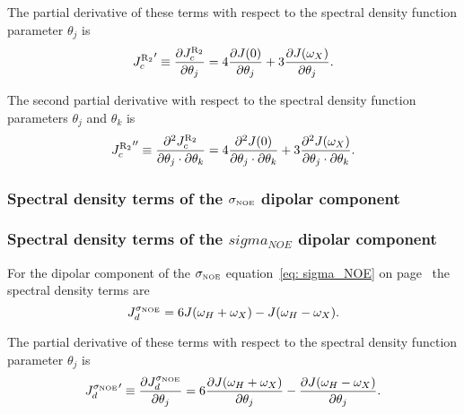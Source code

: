 \noindent The partial derivative of these terms with respect to the spectral density function parameter $\theta_j$ is
\begin{equation}
    {J_c^{\mathrm{R}_2}}' \equiv \frac{\partial J_c^{\mathrm{R}_2}}{\partial \theta_j}
        = 4 \frac{\partial J(0)}{\partial \theta_j}
        + 3 \frac{\partial J(\omega_X)}{\partial \theta_j}.  \label{eq: J terms: JR2c'}
\end{equation}

\noindent The second partial derivative with respect to the spectral density function parameters $\theta_j$ and $\theta_k$ is
\begin{equation}
    {J_c^{\mathrm{R}_2}}'' \equiv \frac{\partial^2 J_c^{\mathrm{R}_2}}{\partial \theta_j \cdot \partial \theta_k}
        = 4 \frac{\partial^2 J(0)}{\partial \theta_j \cdot \partial \theta_k}
        + 3 \frac{\partial^2 J(\omega_X)}{\partial \theta_j \cdot \partial \theta_k}.  \label{eq: J terms: JR2c"}
\end{equation}


\begin{latexonly}
    \subsubsection{Spectral density terms of the $\sigma_{\scriptscriptstyle \mathrm{NOE}}$ dipolar component}
\end{latexonly}
\begin{htmlonly}
    \subsubsection{Spectral density terms of the $sigma_{NOE}$ dipolar component}
\end{htmlonly}

For the dipolar component of the $\sigma_{\scriptscriptstyle \mathrm{NOE}}$ equation~\eqref{eq: sigma_NOE} on page~\pageref{eq: sigma_NOE} the spectral density terms are
\begin{equation}
    J_d^{\sigma_{\scriptscriptstyle \mathrm{NOE}}} = 6J(\omega_H + \omega_X) - J(\omega_H - \omega_X).  \label{eq: J terms: JsigmaNOEd}
\end{equation}

\noindent The partial derivative of these terms with respect to the spectral density function parameter $\theta_j$ is
\begin{equation}
    {J_d^{\sigma_{\scriptscriptstyle \mathrm{NOE}}}}' \equiv \frac{\partial J_d^{\sigma_{\scriptscriptstyle \mathrm{NOE}}}}{\partial \theta_j}
        = 6 \frac{\partial J(\omega_H + \omega_X)}{\partial \theta_j}
          - \frac{\partial J(\omega_H - \omega_X)}{\partial \theta_j}.  \label{eq: J terms: JsigmaNOEd'}
\end{equation}

